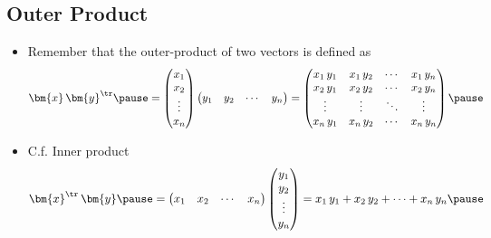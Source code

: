 
\begin{slide}
\section{Outer Product}

\begin{PauseHighLight}

\begin{itemize}
\item Remember that the outer-product of two vectors is defined as
  \begin{displaymath}
    \bm{x}\,\bm{y}^\tr\pause = 
    \begin{pmatrix}
      x_1\\ x_2 \\ \vdots \\ x_n
    \end{pmatrix}
    \begin{pmatrix}
      y_1& y_2& \cdots& y_n
    \end{pmatrix} = 
    \begin{pmatrix}
      x_1\,y_1 & x_1\,y_2 & \cdots & x_1\,y_n \\
      x_2\,y_1 & x_2\,y_2 & \cdots & x_2\,y_n \\
      \vdots & \vdots & \ddots & \vdots \\
      x_n\,y_1 & x_n\,y_2 & \cdots & x_n\,y_n
    \end{pmatrix}\pause
  \end{displaymath}
\item C.f. Inner product
  \begin{displaymath}
    \bm{x}^\tr\,\bm{y}\pause = 
    \begin{pmatrix}
      x_1 & x_2 & \cdots & x_n
    \end{pmatrix}
    \begin{pmatrix}
      y_1 \\ y_2 \\ \vdots \\ y_n
    \end{pmatrix} = x_1\,y_1 + x_2\,y_2 + \cdots + x_n\,y_n\pause
  \end{displaymath}
\end{itemize}

\end{PauseHighLight}
\end{slide}


